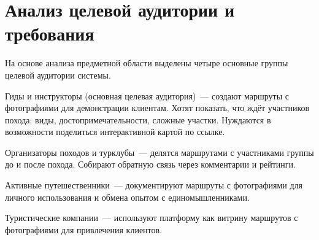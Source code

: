 \section{Анализ целевой аудитории и требования}

На основе анализа предметной области выделены четыре основные группы целевой аудитории системы.

Гиды и инструкторы (основная целевая аудитория)~--- создают маршруты с фотографиями для демонстрации клиентам. Хотят показать, что ждёт участников похода: виды, достопримечательности, сложные участки. Нуждаются в возможности поделиться интерактивной картой по ссылке.

Организаторы походов и турклубы~--- делятся маршрутами с участниками группы до и после похода. Собирают обратную связь через комментарии и рейтинги.

Активные путешественники~--- документируют маршруты с фотографиями для личного использования и обмена опытом с единомышленниками.

Туристические компании~--- используют платформу как витрину маршрутов с фотографиями для привлечения клиентов.

